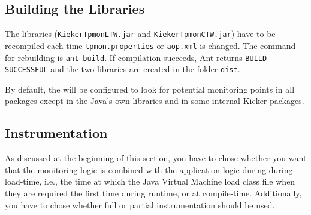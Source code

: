 \documentclass[a4paper,12pt]{scrartcl}
\begin{document}
\subsection{Building the \tpmon{} Libraries}
The \tpmon{} libraries (\texttt{KiekerTpmonLTW.jar} and \texttt{KiekerTpmonCTW.jar}) have to be recompiled each time \texttt{tpmon.properties} or \texttt{aop.xml} is changed. The command for rebuilding \tpmon{} is \texttt{ant build}. If compilation succeeds, Ant returns \texttt{BUILD SUCCESSFUL} and the two libraries are created in the folder \texttt{dist}.

By default, the \tpmonltw{} will be configured to look for potential monitoring points in all packages except in the Java's own libraries and in some internal Kieker packages. %

%
%

\subsection{Instrumentation}
As discussed at the beginning of this section, you have to chose
 whether you want that the monitoring logic is combined with the application
 logic during during load-time, i.e., the time at which the Java Virtual Machine
 load class file when they are required the first time during runtime, or at compile-time. Additionally,
you have to chose whether full or partial instrumentation should be used.
\end{document}
